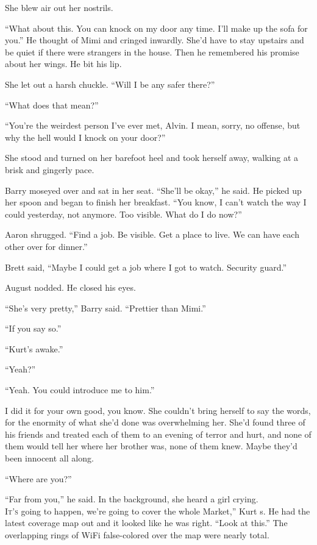 \documentclass{article}
\begin{document}
She blew air out her nostrils. 

``What about this.  You can knock on my door any time.  I'll make up
the sofa for you.'' He thought of Mimi and cringed inwardly.  She'd
have to stay upstairs and be quiet if there were strangers in the
house.  Then he remembered his promise about her wings.  He bit his
lip.

She let out a harsh chuckle.  ``Will I be any safer there?''

``What does that mean?''

``You're the weirdest person I've ever met, Alvin.  I mean, sorry, no
offense, but why the hell would I knock on your door?''

She stood and turned on her barefoot heel and took herself away,
walking at a brisk and gingerly pace.

Barry moseyed over and sat in her seat.  ``She'll be okay,'' he said. 
He picked up her spoon and began to finish her breakfast.  ``You know,
I can't watch the way I could yesterday, not anymore.  Too visible. 
What do I do now?''

Aaron shrugged.  ``Find a job.  Be visible.  Get a place to live.  We
can have each other over for dinner.''

Brett said, ``Maybe I could get a job where I got to watch.  Security
guard.''

August nodded.  He closed his eyes.

``She's very pretty,'' Barry said.  ``Prettier than Mimi.''

``If you say so.''

``Kurt's awake.''

``Yeah?''

``Yeah.  You could introduce me to him.''

I did it for your own good, you know.  She couldn't bring herself to
say the words, for the enormity of what she'd done was overwhelming
her.  She'd found three of his friends and treated each of them to an
evening of terror and hurt, and none of them would tell her where her
brother was, none of them knew.  Maybe they'd been innocent all along.

``Where are you?''

``Far from you,'' he said.  In the background, she heard a girl
crying.
\\
\lettrine[lines=3, lhang=.5, nindent=0pt, findent=2pt]{I}{t's}
going to happen, we're going to cover the whole Market,'' Kurt
s.  He had the latest coverage map out and it looked like he was
right.  ``Look at this.'' The overlapping rings of WiFi false-colored
over the map were nearly total. 
\end{document}
